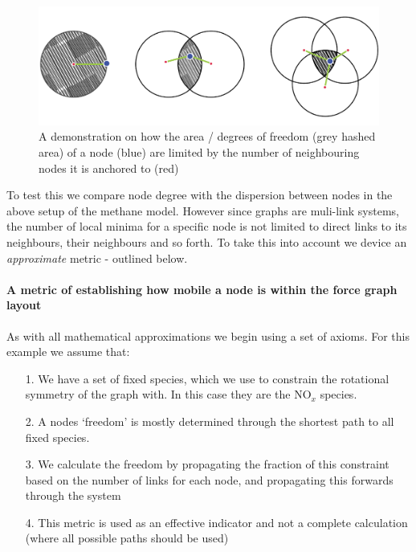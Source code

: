\begin{figure}[H]
    \centering
    \includegraphics[width=.8\textwidth]{figures_c1/circles.png}
    \caption{A demonstration on how the area / degrees of freedom (grey hashed area) of a node (blue) are limited by the number of neighbouring nodes it is anchored to (red) }
    \label{fig:circle}
\end{figure}

To test this we compare node degree with the dispersion between nodes in the above setup of the methane model. However since graphs are muli-link systems, the number of local minima for a specific node is not limited to direct links to its neighbours, their neighbours and so forth. To take this into account we device an \textit{approximate} metric - outlined below. 

\paragraph*{ A metric of establishing how mobile a node is within the force graph layout}
As with all mathematical approximations we begin using a set of axioms. For this example we assume that: 
\begin{itemize}
    \item[1.] We have a set of fixed species, which we use to constrain the rotational symmetry of the graph with. In this case they are the NO$_x$ species.
    \item[2.] A nodes `freedom' is mostly determined through the shortest path to all fixed species. 
    \item[3.] We calculate the freedom by propagating the fraction of this constraint based on the number of links for each node, and propagating this forwards through the system
    \item[4.] This metric is used as an effective indicator and not a complete calculation (where all possible paths should be used)
\end{itemize}


